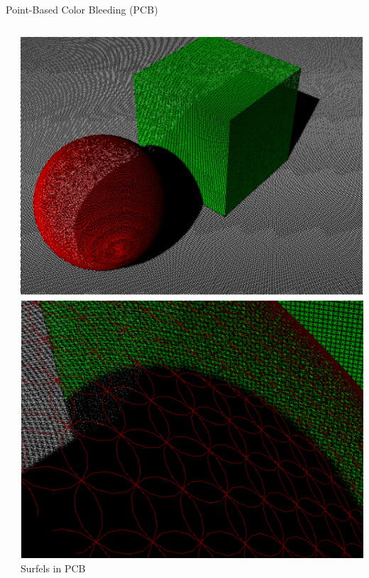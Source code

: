 \documentclass[10pt,handout,compress,professionalfont]{beamer}
\begin{document}
\begin{frame}{Point-Based Color Bleeding (PCB)}
\begin{columns}
\begin{column}{0.65\textwidth}
        \end{column}
        \begin{column}{0.35\textwidth}
            \vspace{-4mm}
            \includegraphics[width=\textwidth]{../img/external/pcb}\\
            {\centering\scriptsize Surfels in PCB\\}
        \end{column}
    \end{columns}

\end{frame}
\end{document}
